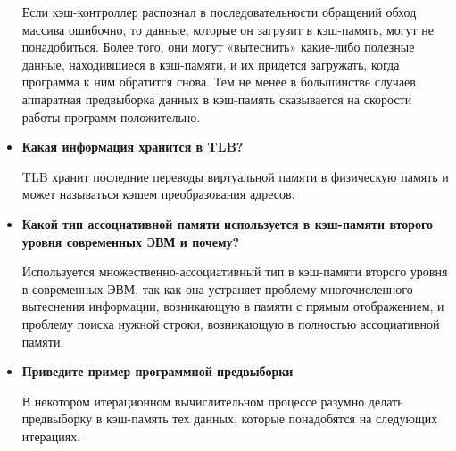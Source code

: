 \begin{itemize}[left=-0.5\parindent]
        Если кэш-контроллер распознал в последовательности обращений обход
        массива ошибочно, то данные, которые он загрузит в кэш-память, могут
        не понадобиться. Более того, они могут «вытеснить» какие-либо полезные
        данные, находившиеся в кэш-памяти, и их придется загружать, когда
        программа к ним обратится снова. Тем не менее в большинстве случаев
        аппаратная предвыборка данных в кэш-память сказывается на скорости
        работы программ положительно.
        ~\\

    \item \textbf{Какая информация хранится в TLB?}

        TLB хранит последние переводы виртуальной памяти в физическую память и
        может называться кэшем преобразования адресов.
        ~\\

    \item \textbf{Какой тип ассоциативной памяти используется в кэш-памяти
                  второго уровня современных ЭВМ и почему?}

        Используется множественно-ассоциативный тип в кэш-памяти второго
        уровня в современных ЭВМ, так как она устраняет проблему
        многочисленного вытеснения информации, возникающую в памяти с прямым
        отображением, и проблему поиска нужной строки, возникающую в полностью
        ассоциативной памяти.
        ~\\

    \item \textbf{Приведите пример программной предвыборки}

        В некотором итерационном вычислительном процессе разумно делать
        предвыборку в кэш-память тех данных, которые понадобятся на следующих
        итерациях.
\end{itemize}
